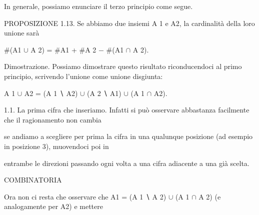 \documentclass[a4paper,portrait,12pt]{article}
\begin{document}
\begin{flushleft}
In generale, possiamo enunciare il terzo principio come segue.
\end{flushleft}


\begin{flushleft}
PROPOSIZIONE 1.13. Se abbiamo due insiemi A 1 e A2, la cardinalit\`{a} della loro unione sar\`{a}
\end{flushleft}


\begin{flushleft}
\#(A1 $\cup$ A 2) = \#A1 + \#A 2 $-$ \#(A1 $\cap$ A 2).
\end{flushleft}


\begin{flushleft}
Dimostrazione. Possiamo dimostrare questo risultato riconducendoci al primo principio, scrivendo l'unione come unione disgiunta:
\end{flushleft}


\begin{flushleft}
A 1 $\cup$ A2 = (A 1 ∖ A2) $\cup$ (A 2 ∖ A1) $\cup$ (A 1 $\cap$ A2).
\end{flushleft}


\begin{flushleft}
1.1. La prima cifra che inseriamo. Infatti si pu\`{o} osservare abbastanza facilmente che il ragionamento non cambia
\end{flushleft}


\begin{flushleft}
se andiamo a scegliere per prima la cifra in una qualunque posizione (ad esempio in posizione 3), muovendoci poi in
\end{flushleft}


\begin{flushleft}
entrambe le direzioni passando ogni volta a una cifra adiacente a una gi\`{a} scelta.
\end{flushleft}










\begin{flushleft}
COMBINATORIA
\end{flushleft}





\begin{flushleft}
Ora non ci resta che osservare che A1 = (A 1 ∖ A 2) $\cup$ (A 1 $\cap$ A 2) (e analogamente per A2) e mettere
\end{flushleft}
\end{document}
